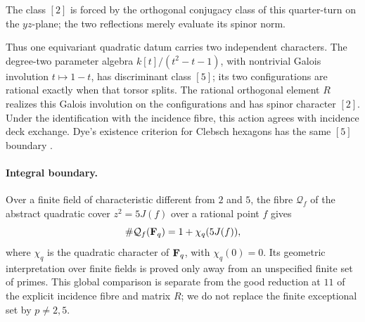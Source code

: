 The class \([2]\) is forced by the orthogonal conjugacy class of this
quarter-turn on the \(yz\)-plane; the two reflections merely evaluate its
spinor norm.

Thus one equivariant quadratic datum carries two independent characters.
The degree-two parameter algebra \(k[t]/(t^2-t-1)\), with nontrivial Galois involution
\(t\mapsto1-t\), has discriminant class \([5]\); its two configurations are
rational exactly when that torsor splits.  The rational orthogonal element
\(R\) realizes this Galois involution on the configurations and has spinor
character \([2]\).  Under the identification with the incidence fibre, this
action agrees with incidence deck exchange.  Dye's existence criterion for Clebsch hexagons has the same
\([5]\) boundary \cite[Theorem~1]{DyeClebsch}.

\paragraph{Integral boundary.}
Over a finite field of characteristic different from \(2\) and \(5\), the
fibre \(\mathcal Q_f\) of the abstract quadratic cover
\(z^2=5J(f)\) over a rational point \(f\) gives
\[
 \#\mathcal Q_f(\mathbf F_q)=1+\chi_q(5J(f)),
\]
where \(\chi_q\) is the quadratic character of \(\mathbf F_q\), with \(\chi_q(0)=0\).
Its geometric interpretation over finite fields is proved only away
from an unspecified finite set of primes.  This global comparison is
separate from the good reduction at \(11\) of the explicit incidence fibre and
matrix \(R\); we do not replace the finite exceptional set by
\(p\ne2,5\).
